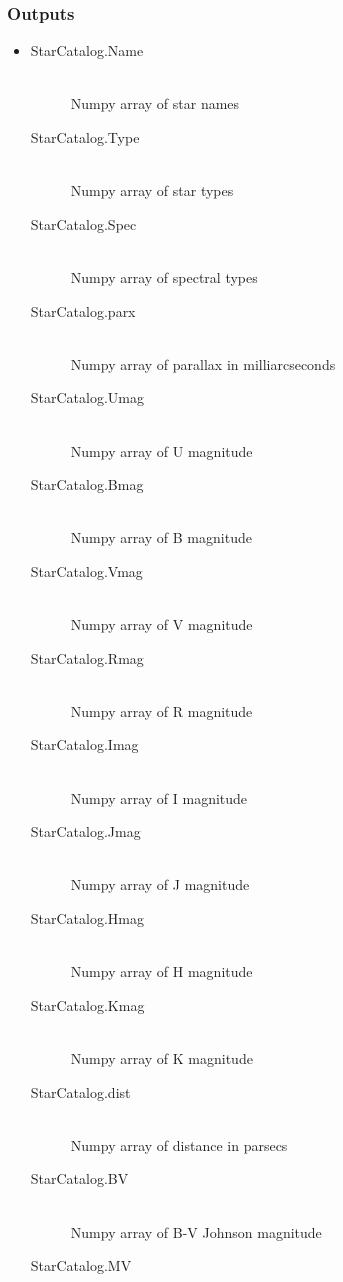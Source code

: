 \documentclass[cleanfoot]{asme2ej}
\begin{document}
\subsubsection*{Outputs}
\begin{itemize}
    \item 
    \begin{description}
        \item[StarCatalog.Name] \hfill \\
        Numpy array of star names
        \item[StarCatalog.Type] \hfill \\
        Numpy array of star types
        \item[StarCatalog.Spec] \hfill \\
        Numpy array of spectral types
        \item[StarCatalog.parx] \hfill \\
        Numpy array of parallax in milliarcseconds
        \item[StarCatalog.Umag] \hfill \\
        Numpy array of U magnitude
        \item[StarCatalog.Bmag] \hfill \\
        Numpy array of B magnitude
        \item[StarCatalog.Vmag] \hfill \\
        Numpy array of V magnitude
        \item[StarCatalog.Rmag] \hfill \\
        Numpy array of R magnitude
        \item[StarCatalog.Imag] \hfill \\
        Numpy array of I magnitude
        \item[StarCatalog.Jmag] \hfill \\
        Numpy array of J magnitude
        \item[StarCatalog.Hmag] \hfill \\
        Numpy array of H magnitude
        \item[StarCatalog.Kmag] \hfill \\
        Numpy array of K magnitude
        \item[StarCatalog.dist] \hfill \\
        Numpy array of distance in parsecs
        \item[StarCatalog.BV] \hfill \\
        Numpy array of B-V Johnson magnitude
        \item[StarCatalog.MV] \hfill \\

\end{description}
\end{itemize}
\end{document}

